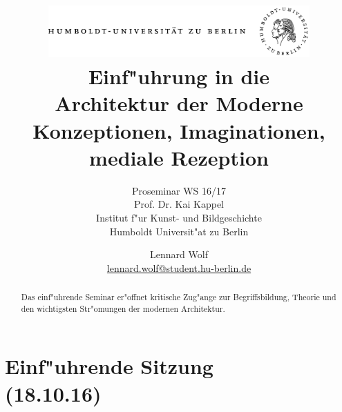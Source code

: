 \documentclass[]{scrartcl}
\begin{document}
\title{
	\includegraphics*[width=0.75\textwidth]{images/hu_logo.png}\\
	\vspace{24pt}
	Einf"uhrung in die \\ Architektur der Moderne\\ Konzeptionen, Imaginationen,\\ mediale Rezeption}
\subtitle{Proseminar WS 16/17\\
          Prof. Dr. Kai Kappel\\
          Institut f"ur Kunst- und Bildgeschichte \\ 
          Humboldt Universit"at zu Berlin}
\author{Lennard Wolf\\
        \href{mailto:lennard.wolf@student.hu-berlin.de}{lennard.wolf@student.hu-berlin.de}}
\maketitle
\begin{abstract}

Das einf"uhrende Seminar er"offnet kritische Zug"ange zur Begriffsbildung, Theorie und den wichtigsten Str"omungen der modernen Architektur. 

\end{abstract}
\newpage

\tableofcontents
\newpage

\listoffigures
\newpage


\section{Einf"uhrende Sitzung\\(18.10.16)}
\end{document}

